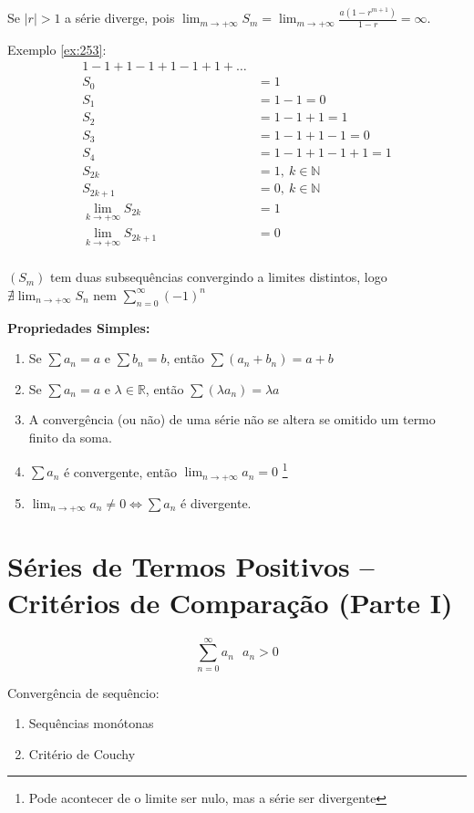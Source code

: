 \documentclass[12pt,openany]{book}
\begin{document}
Se $|r| > 1$ a série diverge, pois $\displaystyle{\lim_{m \rightarrow +\infty} S_m = \lim_{m \rightarrow +\infty} \frac{a(1-r^{m+1})}{1-r} = \infty}$.

Exemplo \ref{ex:253}: 
\begin{align*} 
1 - 1 + 1 - 1 + 1 - 1 + 1 + \hdots \\
S_0 &= 1 \\
S_1 &= 1 - 1 = 0 \\
S_2 &= 1 - 1 + 1 = 1 \\
S_3 &= 1 - 1 + 1  - 1 = 0 \\
S_4 &= 1 - 1 + 1  - 1 + 1 = 1 \\
S_{2k} &= 1, \ k \in \mathds{N} \\
S_{2k+1} &= 0, \ k \in \mathds{N} \\
\lim_{k \rightarrow +\infty} S_{2k} &= 1 \\
\lim_{k \rightarrow +\infty} S_{2k+1} &= 0 \\
\end{align*}

$(S_m)$  tem duas subsequências convergindo a limites distintos, logo $\nexists \displaystyle{\lim_{n \rightarrow +\infty} S_{n}}$ nem $\displaystyle{\sum_{n=0}^{\infty} (-1)^n}$

\textbf{Propriedades Simples:}
\begin{enumerate}
\item Se $\sum a_n = a$ e $\sum b_n = b$, então $\sum (a_n+b_n) = a+b$
\item Se $\sum a_n = a$ e $\lambda \in \mathds{R}$, então $\sum (\lambda a_n) = \lambda a$
\item A convergência (ou não) de uma série não se altera se omitido um termo finito da soma.
\item $\displaystyle{\sum a_n}$ é convergente, então $\displaystyle{\lim_{n \rightarrow +\infty} a_n = 0}$ \footnote{Pode acontecer de o limite ser nulo, mas a série ser divergente}
\item $\displaystyle{\lim_{n \rightarrow +\infty} a_n \neq 0 \Longleftrightarrow \sum a_n}$ é divergente.
\end{enumerate}

\section{Séries de Termos Positivos -- Critérios de Comparação (Parte I)}
\label{sec:s26}
$$\sum_{n=0}^{\infty} a_n \ \ \ a_n > 0 $$

Convergência de sequêncio:
\begin{enumerate}
\item Sequências monótonas \label{261}
\item Critério de Couchy \label{262}
\end{enumerate}
\end{document}
